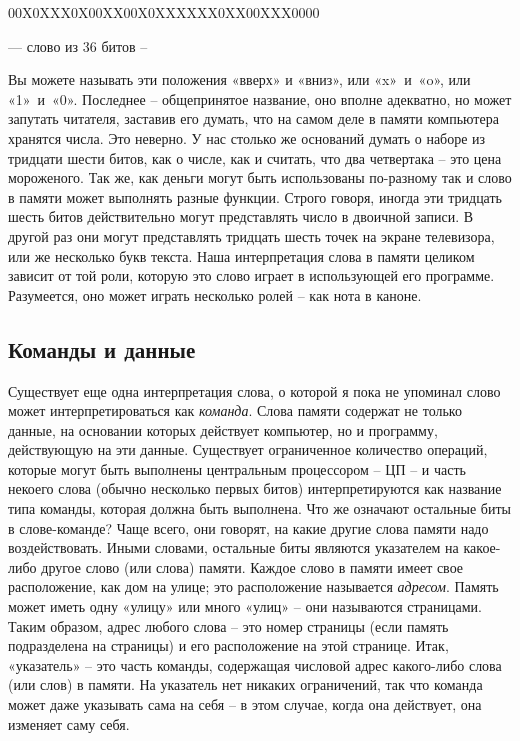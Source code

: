 \documentclass[../main.tex]{subfiles}
\begin{document}
00X0XXX0X00XX00X0XXXXXX0XX00XXX0000

--- слово из 36 битов \---

Вы можете называть эти положения «вверх» и «вниз», или «x»~и~«o», или «1»~и~«0». Последнее \--- общепринятое название, оно вполне адекватно, но может запутать читателя, заставив его думать, что на самом деле в памяти компьютера хранятся числа. Это неверно. У нас столько же оснований думать о наборе из тридцати шести битов, как о числе, как и считать, что два четвертака \--- это цена мороженого. Так же, как деньги могут быть использованы по-разному так и слово в памяти может выполнять разные функции. Строго говоря, иногда эти тридцать шесть битов действительно могут представлять число в двоичной записи. В другой раз они могут представлять тридцать шесть точек на экране телевизора, или же несколько букв текста. Наша интерпретация слова в памяти целиком зависит от той роли, которую это слово играет в использующей его программе. Разумеется, оно может играть несколько ролей \--- как нота в каноне.


\subsection{Команды и данные}

Существует еще одна интерпретация слова, о которой я пока не упоминал слово может интерпретироваться как \emph{команда}. Слова памяти содержат не только данные, на основании которых действует компьютер, но и программу, действующую на эти данные. Существует ограниченное количество операций, которые могут быть выполнены центральным процессором \--- ЦП \--- и часть некоего слова (обычно несколько первых битов) интерпретируются как название типа команды, которая должна быть выполнена. Что же означают остальные биты в слове-команде? Чаще всего, они говорят, на какие другие слова памяти надо воздействовать. Иными словами, остальные биты являются указателем на какое-либо другое слово (или слова) памяти. Каждое слово в памяти имеет свое расположение, как дом на улице; это расположение называется \emph{адресом}. Память может иметь одну «улицу» или много «улиц» \--- они называются страницами. Таким образом, адрес любого слова \--- это номер страницы (если память подразделена на страницы) и его расположение на этой странице. Итак, «указатель» \--- это часть команды, содержащая числовой адрес какого-либо слова (или слов) в памяти. На указатель нет никаких ограничений, так что команда может даже указывать сама на себя \--- в этом случае, когда она действует, она изменяет саму себя.
\end{document}

